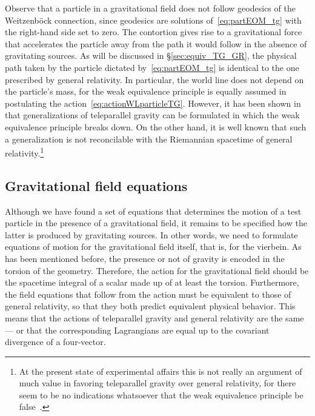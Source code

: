 \documentclass[
final,
11pt,
a4paper,
DIV=11,
headinclude=true,
footinclude=false,
bibliography=totoc,
twoside=true,  %
BCOR=5mm
]{scrbook}
\begin{document}
Observe that a particle in a gravitational field does not follow 
geodesics of the Weitzenb\"ock connection, since geodesics are 
solutions of~\eqref{eq:partEOM_tg} with the right-hand side set 
to zero. The contortion gives rise to a gravitational force that 
accelerates the particle away from the path it would follow in 
the absence of gravitating sources.  As will be discussed in 
\S\ref{sec:equiv_TG_GR}, the physical path taken by the particle 
dictated by~\eqref{eq:partEOM_tg} is identical to the one 
prescribed by general relativity. In particular, the world line 
does not depend on the particle's mass, for the weak equivalence 
principle is equally assumed in postulating the 
action~\eqref{eq:actionWLparticleTG}. However, it has been shown 
in~\cite{Aldrovandi:2003xu} that generalizations of teleparallel 
gravity can be formulated in which the weak equivalence principle 
breaks down.  On the other hand, it is well known that such 
a generalization is not reconcilable with the Riemannian 
spacetime of general relativity.\footnote{At the present state of 
  experimental affairs this is not really an argument of much 
  value in favoring teleparallel gravity over general relativity, 
  for there seem to be no indications whatsoever that the weak 
  equivalence principle be false~\cite{Wagner:2012ui}.} 

\subsection{Gravitational field equations}

Although we have found a set of equations that determines the 
motion of a test particle in the presence of a gravitational 
field, it remains to be specified how the latter is produced by 
gravitating sources. In other words, we need to formulate 
equations of motion for the gravitational field itself, that is, 
for the vierbein. As has been mentioned before, the presence or 
not of gravity is encoded in the torsion of the geometry.  
Therefore, the action for the gravitational field should be the 
spacetime integral of a scalar made up of at least the torsion.  
Furthermore, the field equations that follow from the action must 
be equivalent to those of general relativity, so that they both 
predict equivalent physical behavior. This means that the actions 
of teleparallel gravity and general relativity are the same--- or 
that the corresponding Lagrangians are equal up to the covariant 
divergence of a four-vector.
\end{document}
